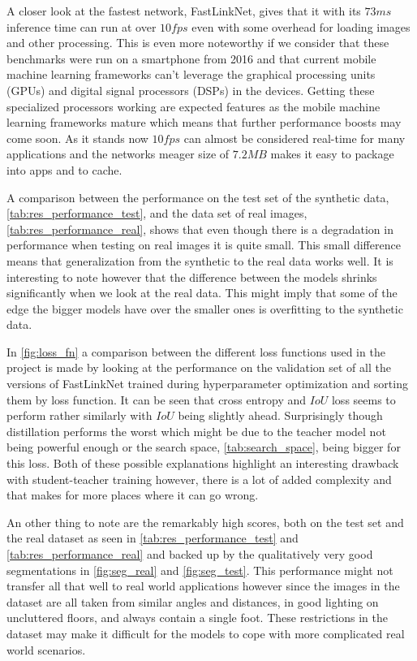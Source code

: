 \documentclass{kththesis}
\begin{document}
A closer look at the fastest network, FastLinkNet, gives that it with its \(73
ms\) inference time can run at over \(10 fps\) even with some overhead for
loading images and other processing. This is even more noteworthy if we consider
that these benchmarks were run on a smartphone from 2016 and that current mobile
machine learning frameworks can't leverage the graphical processing units (GPUs)
and digital signal processors (DSPs) in the devices. Getting these specialized
processors working are expected features as the mobile machine learning
frameworks mature which means that further performance boosts may come soon. As
it stands now \(10 fps\) can almost be considered real-time for many
applications and the networks meager size of \(7.2 MB\) makes it easy to package
into apps and to cache.

A comparison between the performance on the test set of the synthetic data,
\cref{tab:res_performance_test}, and the data set of real images,
\cref{tab:res_performance_real}, shows that even though there is a
degradation in performance when testing on real images it is quite small. This
small difference means that generalization from the synthetic to the real data
works well. It is interesting to note however that the difference between the
models shrinks significantly when we look at the real data. This might imply
that some of the edge the bigger models have over the smaller ones is
overfitting to the synthetic data.

In \cref{fig:loss_fn} a comparison between the different loss functions used in
the project is made by looking at the performance on the validation set of all
the versions of FastLinkNet trained during hyperparameter optimization and
sorting them by loss function. It can be seen that cross entropy and \(IoU\)
loss seems to perform rather similarly with \(IoU\) being slightly ahead.
Surprisingly though distillation performs the worst which might be due to the
teacher model not being powerful enough or the search space,
\cref{tab:search_space}, being bigger for this loss. Both of these possible
explanations highlight an interesting drawback with student-teacher training
however, there is a lot of added complexity and that makes for more places where
it can go wrong.

An other thing to note are the remarkably high scores, both on the test set
and the real dataset as seen in \cref{tab:res_performance_test} and
\cref{tab:res_performance_real} and backed up by the qualitatively very good
segmentations in \cref{fig:seg_real} and \cref{fig:seg_test}. This performance
might not transfer all that well to real world applications however since the
images in the dataset are all taken from similar angles and distances, in good
lighting on uncluttered floors, and always contain a single foot. These
restrictions in the dataset may make it difficult for the models to cope with
more complicated real world scenarios.
\end{document}

